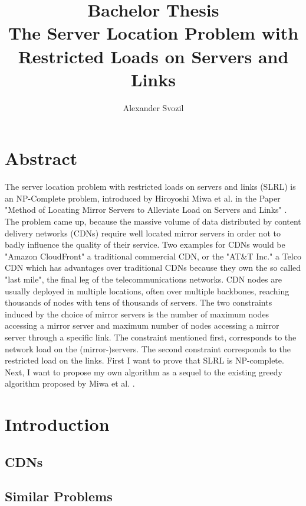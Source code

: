 \documentclass [12pt]{article}
\begin{document}
\author{Alexander Svozil}
\title{Bachelor Thesis \\ The Server Location Problem with Restricted Loads 
on Servers and Links}

\maketitle

\section{Abstract}
The server location problem with restricted loads on servers and links (SLRL) is an NP-Complete
problem, introduced by Hiroyoshi Miwa et al. in the Paper "Method of Locating Mirror Servers
to Alleviate Load on Servers and Links" \cite{mirrorserver}. The problem 
came up, because the massive volume of data distributed by content delivery networks (CDNs) 
require well located mirror servers in order not to badly influence the quality of their service.
Two examples for CDNs would be "Amazon CloudFront" a traditional commercial CDN, or the "AT\&T Inc."
a Telco CDN which has advantages over traditional CDNs because they own the so called "last mile",
the final leg of the telecommunications networks. CDN nodes are usually deployed in multiple 
locations, often over multiple backbones, reaching thousands of nodes with tens of thousands of 
servers. \cite{wiki:cdn} \cite{wiki:lastmile}
The two constraints induced by the choice of mirror servers is the number of maximum nodes
accessing a mirror server and maximum number of nodes accessing a mirror server 
through a specific link. The constraint mentioned first, corresponds to the network load on
the (mirror-)servers. The second constraint corresponds to the restricted load on the links.
First I want to prove that SLRL is NP-complete. Next, I want to propose my own algorithm as a
sequel to the existing greedy algorithm proposed by Miwa et al. \cite{mirrorserver}.


\tableofcontents

\section{Introduction}
    \subsection {CDNs}

    \subsection {Similar Problems}
\end{document}
